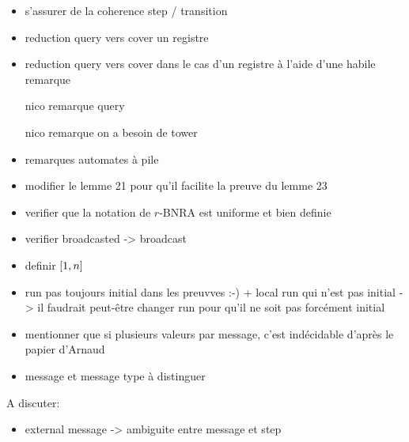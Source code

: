 \begin{itemize}
	\item s'assurer de la coherence step / transition
    \item reduction query vers cover un registre
    \item reduction query vers cover dans le cas d'un registre à l'aide d'une habile remarque
    \item[nico] remarque query 
    \item[nico] remarque on a besoin de tower
    \item remarques automates à pile
    \item modifier le lemme 21 pour qu'il facilite la preuve du lemme 23
    \item verifier que la notation de $r$-BNRA est uniforme et bien definie
    \item  verifier broadcasted -> broadcast
    \item definir $[1,n]$
    \item run pas toujours initial dans les preuvves :-) + local run qui n'est pas initial -> il faudrait peut-être changer run pour qu'il ne soit pas forcément initial
    \item mentionner que si plusieurs valeurs par message, c'est indécidable d'après le papier d'Arnaud
    \item message et message type à distinguer 
\end{itemize}

A discuter:
\begin{itemize}
\item external message -> ambiguite entre message et step 
\end{itemize}